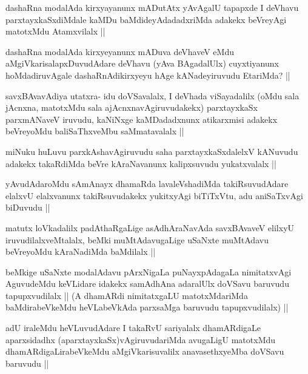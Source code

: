 \begin{artha}
dashaRna modalAda kirxyayanunx mADutAtx yAvAgalU tapapxde I deVhavu parxtayxkaSxdiMdale kaMDu baMdideyAdadadxriMda adakekx beVreyAgi matotxMdu Atamxvilalx ||
\end{artha}

\begin{artha}
dashaRna modalAda kirxyeyanunx mADuva deVhaveV eMdu aMgiVkarisalapxDuvudAdare deVhavu (yAva BAgadalUlx) cuyxtiyanunx hoMdadiruvAgale dashaRnAdikirxyeyu hAge kANadeyiruvudu EtariMda? ||
\end{artha}

\begin{artha}
savxBAvavAdiya utatxra- idu doVSavalalx, I deVhada viSayadalilx (oMdu sala jAcnxna, matotxMdu sala ajAcnxnavAgiruvudakekx) parxtayxkaSx parxmANaveV iruvudu, kaNiNxge kaMDadadxnunx atikarxmisi adakekx beVreyoMdu baliSaThxveMbu saMmatavalalx ||
\end{artha}

\begin{artha}
miNuku huLuvu parxkAshavAgiruvudu saha parxtayxkaSxdalelxV kANuvudu adakekx takaRdiMda beVre kAraNavanunx kalipxsuvudu yukatxvalalx ||
\end{artha}

\begin{artha}
yAvudAdaroMdu sAmAnayx dhamaRda lavaleVshadiMda takiRsuvudAdare elalxvU elalxvanunx takiRsuvudakekx yukitxyAgi biTiTxVtu, adu aniSaTxvAgi biDuvudu ||
\end{artha}

\begin{artha}
matutx loVkadalilx padAthaRgaLige asAdhAraNavAda savxBAvaveV elilxyU iruvudilalxveMtalalx, beMki muMtAdavugaLige uSaNxte muMtAdavu beVreyoMdu kAraNadiMda baMdilalx ||
\end{artha}

\begin{artha}
beMkige uSaNxte modalAdavu pArxNigaLa puNayxpAdagaLa nimitatxvAgi AguvudeMdu keVLidare idakekx samAdhAna adaralUlx doVSavu baruvudu tapupxvudilalx || (A dhamARdi nimitatxgaLU matotxMdariMda baMdirabeVkeMdu heVLabeVkAda parxsaMga baruvudu tapupxvudilalx) ||
\end{artha}

\begin{artha}
adU iraleMdu heVLuvudAdare I takaRvU sariyalalx dhamARdigaLe aparxsidadhx (aparxtayxkaSx)vAgiruvudariMda avugaLigU matotxMdu dhamARdigaLirabeVkeMdu aMgiVkarisuvalilx anavasethxyeMba doVSavu baruvudu ||
\end{artha}

